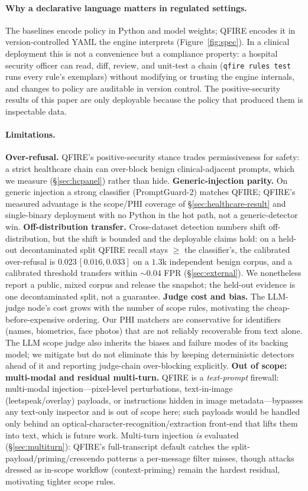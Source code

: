 \documentclass[11pt]{article}
\begin{document}
\paragraph{Why a declarative language matters in regulated settings.}
The baselines encode policy in Python and model weights; QFIRE encodes it in
version-controlled YAML the engine interprets (Figure~\ref{fig:spec}). In a
clinical deployment this is not a convenience but a compliance property: a hospital
security officer can read, diff, review, and unit-test a chain
(\texttt{qfire rules test} runs every rule's exemplars) without modifying or
trusting the engine internals, and changes to policy are auditable in version
control. The positive-security results of this paper are only deployable because
the policy that produced them is inspectable data.

\paragraph{Limitations.}
\textbf{Over-refusal.} QFIRE's positive-security stance trades permissiveness for
safety: a strict healthcare chain can over-block benign clinical-adjacent prompts,
which we measure (\S\ref{sec:hcpanel}) rather than hide.
\textbf{Generic-injection parity.} On generic injection a strong classifier
(PromptGuard-2) matches QFIRE; QFIRE's measured advantage is the scope/PHI coverage
of \S\ref{sec:healthcare-result} and single-binary deployment with no Python in the
hot path, not a generic-detector win.
\textbf{Off-distribution transfer.} Cross-dataset detection numbers shift
off-distribution, but the shift is bounded and the deployable claims hold: on a
held-out decontaminated split QFIRE recall stays $\ge$ the classifier's, the
calibrated over-refusal is $0.023\,[0.016,0.033]$ on a $1.3$k independent benign
corpus, and a calibrated threshold transfers within $\sim\!0.04$ FPR
(\S\ref{sec:external}). We nonetheless report a public, mixed corpus and release the
snapshot; the held-out evidence is one decontaminated split, not a guarantee.
\textbf{Judge cost and bias.} The LLM-judge node's cost grows with the number of
scope rules, motivating the cheap-before-expensive ordering. Our PHI matchers are
conservative for identifiers (names, biometrics, face photos) that are not reliably
recoverable from text alone. The LLM scope judge also inherits the biases and failure
modes of its backing model; we mitigate but do not eliminate this by keeping
deterministic detectors ahead of it and reporting judge-chain over-blocking explicitly.
\textbf{Out of scope: multi-modal and residual multi-turn.} QFIRE is a
\emph{text-prompt} firewall: multi-modal injection---pixel-level perturbations,
text-in-image (leetspeak/overlay) payloads, or instructions hidden in image
metadata---bypasses any text-only inspector and is out of scope here; such payloads
would be handled only behind an optical-character-recognition/extraction front-end
that lifts them into text, which is future work. Multi-turn injection \emph{is}
evaluated (\S\ref{sec:multiturn}): QFIRE's full-transcript default catches the
split-payload/priming/crescendo patterns a per-message filter misses, though attacks
dressed as in-scope workflow (context-priming) remain the hardest residual,
motivating tighter scope rules.
\end{document}
